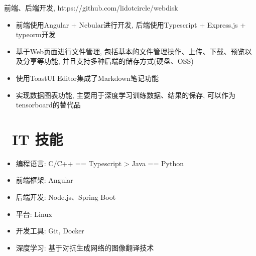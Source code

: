 \documentclass{resume}
\begin{document}
\begin{onehalfspacing}
前端、后端开发, https://github.com/lidotcircle/webdisk
\begin{itemize}
  \item 前端使用Angular + Nebular进行开发, 后端使用Typescript + Express.js + typeorm开发
  \item 基于Web页面进行文件管理, 包括基本的文件管理操作、上传、下载、预览以及分享等功能, 并且支持多种后端的储存方式(硬盘、OSS)
  \item 使用ToastUI Editor集成了Markdown笔记功能
  \item 实现数据图表功能, 主要用于深度学习训练数据、结果的保存, 可以作为tensorboard的替代品
\end{itemize}
\end{onehalfspacing}



\section{\faCogs\ IT 技能}
\begin{itemize}[parsep=0.5ex]
  \item 编程语言: C/C++ == Typescript > Java == Python
  \item 前端框架: Angular
  \item 后端开发: Node.js、Spring Boot
  \item 平台: Linux
  \item 开发工具: Git, Docker
  \item 深度学习: 基于对抗生成网络的图像翻译技术
\end{itemize}
\end{document}
